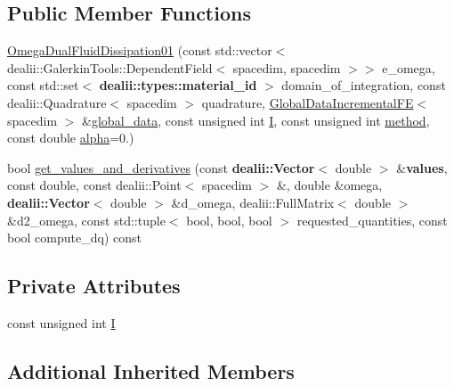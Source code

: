\subsection*{Public Member Functions}
\begin{DoxyCompactItemize}
\item 
\hyperlink{classincremental_f_e_1_1_omega_dual_fluid_dissipation01_a161e82e383f418ba1ddafc1ac56b2300}{Omega\+Dual\+Fluid\+Dissipation01} (const std\+::vector$<$ dealii\+::\+Galerkin\+Tools\+::\+Dependent\+Field$<$ spacedim, spacedim $>$$>$ e\+\_\+omega, const std\+::set$<$ {\bf dealii\+::types\+::material\+\_\+id} $>$ domain\+\_\+of\+\_\+integration, const dealii\+::\+Quadrature$<$ spacedim $>$ quadrature, \hyperlink{classincremental_f_e_1_1_global_data_incremental_f_e}{Global\+Data\+Incremental\+FE}$<$ spacedim $>$ \&\hyperlink{classincremental_f_e_1_1_omega_3_01spacedim_00_01spacedim_01_4_afffe781a5a2032ec003032adc78e1bf3}{global\+\_\+data}, const unsigned int \hyperlink{classincremental_f_e_1_1_omega_dual_fluid_dissipation01_aec63fb36f5a0205121667c38dc0b1b91}{I}, const unsigned int \hyperlink{classincremental_f_e_1_1_omega_3_01spacedim_00_01spacedim_01_4_a6c95d57122261e8a2e26d3818251bc9b}{method}, const double \hyperlink{classincremental_f_e_1_1_omega_3_01spacedim_00_01spacedim_01_4_ad881c36804cc027c301f4f069756c2db}{alpha}=0.)
\item 
bool \hyperlink{classincremental_f_e_1_1_omega_dual_fluid_dissipation01_a3c58b42747ba2c2bed05fa670cf55fb5}{get\+\_\+values\+\_\+and\+\_\+derivatives} (const {\bf dealii\+::\+Vector}$<$ double $>$ \&{\bf values}, const double, const dealii\+::\+Point$<$ spacedim $>$ \&, double \&omega, {\bf dealii\+::\+Vector}$<$ double $>$ \&d\+\_\+omega, dealii\+::\+Full\+Matrix$<$ double $>$ \&d2\+\_\+omega, const std\+::tuple$<$ bool, bool, bool $>$ requested\+\_\+quantities, const bool compute\+\_\+dq) const 
\end{DoxyCompactItemize}
\subsection*{Private Attributes}
\begin{DoxyCompactItemize}
\item 
const unsigned int \hyperlink{classincremental_f_e_1_1_omega_dual_fluid_dissipation01_aec63fb36f5a0205121667c38dc0b1b91}{I}
\end{DoxyCompactItemize}
\subsection*{Additional Inherited Members}


